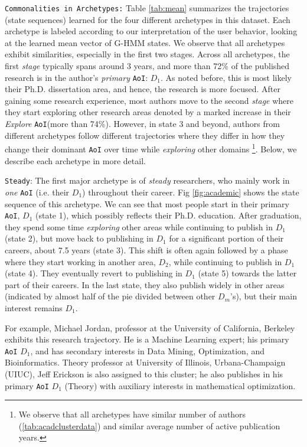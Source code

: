 \texttt{Commonalities in Archetypes:} Table \ref{tab:mean} summarizes the trajectories (state sequences) learned for the four different archetypes in this dataset. Each archetype is labeled according to our interpretation of the user behavior, looking at the learned mean vector of G-HMM states. We observe that all archetypes exhibit similarities, especially in the first two stages. Across all archetypes, the first \emph{stage} typically spans around $3$ years, and more than 72\% of the published research is in the author's \emph{primary} \texttt{AoI}: $D_1$. As noted before, this is most likely their Ph.D. dissertation area, and hence, the research is more focused. After gaining some research experience, most authors move to the second \emph{stage} where they start exploring other research areas denoted by a marked increase in their \emph{Explore} \texttt{AoI}(more than 74\%). However, in state 3 and beyond, authors from different archetypes follow different trajectories where they differ in how they change their dominant \texttt{AoI} over time while \emph{exploring} other domains \footnote{We observe that all archetypes have similar number of authors (\cref{tab:acadclusterdata}) and similar average number of active publication years.}. Below, we describe each archetype in more detail.

\texttt{Steady}: The first major archetype is of \emph{steady} researchers, who mainly work in \emph{one} \texttt{AoI} (i.e. their $D_1$) throughout their career. Fig \ref{fig:academic} shows the state sequence of this archetype. We can see that most people start in their primary \texttt{AoI}, $D_1$ (state 1), which possibly reflects their Ph.D. education. After graduation, they spend some time \emph{exploring} other areas while continuing to publish in $D_1$ (state 2), but move back to publishing in $D_1$ for a significant portion of their careers, about 7.5 years (state 3). This shift is often again followed by a phase where they start working in another area, $D_2$, while continuing to publish in $D_1$ (state 4). They eventually revert to publishing in $D_1$ (state 5) towards the latter part of their careers. In the last state, they also publish widely in other areas (indicated by almost half of the pie divided between other $D_m$'s), but their main interest remains $D_1$.

For example, Michael Jordan, professor at the University of California, Berkeley exhibits this research trajectory. He is a Machine Learning expert; his primary \texttt{AoI} $D_1$, and has secondary interests in Data Mining, Optimization, and Bioinformatics.
Theory professor at University of Illinois, Urbana-Champaign (UIUC), Jeff Erickson is also assigned to this cluster; he also publishes in his primary \texttt{AoI} $D_1$ (Theory) with auxiliary interests in mathematical optimization.

